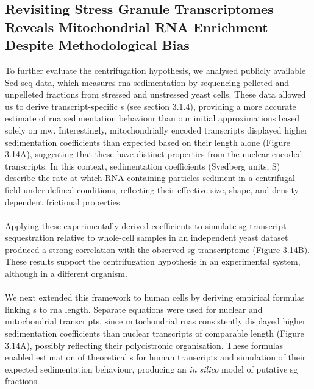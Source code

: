 \subsection{Revisiting Stress Granule Transcriptomes Reveals Mitochondrial RNA Enrichment Despite Methodological Bias}

To further evaluate the centrifugation hypothesis, we analysed publicly available Sed-seq data, which measures \gls{rna} sedimentation by sequencing pelleted and unpelleted fractions from stressed and unstressed yeast cells\cite{glauninger_transcriptome-wide_2025}. These data allowed us to derive transcript-specific \gls{s} (see section 3.1.4), providing a more accurate estimate of \gls{rna} sedimentation behaviour than our initial approximations based solely on \gls{mw}. Interestingly, mitochondrially encoded transcripts displayed higher sedimentation coefficients than expected based on their length alone (Figure 3.14A), suggesting that these have distinct properties from the nuclear encoded transcripts. In this context, sedimentation coefficients (Svedberg units, S) describe the rate at which RNA-containing particles sediment in a centrifugal field under defined conditions, reflecting their effective size, shape, and density-dependent frictional properties\cite{svedberg_ultracentrifuge_1940}.
\\
\\
Applying these experimentally derived coefficients to simulate \gls{sg} transcript sequestration relative to whole-cell samples in an independent yeast dataset\cite{khong_stress_2017} produced a strong correlation with the observed \gls{sg} transcriptome (Figure 3.14B). These results support the centrifugation hypothesis in an experimental system, although in a different organism.
\\
\\
We next extended this framework to human cells by deriving empirical formulas linking \gls{s} to \gls{rna} length. Separate equations were used for nuclear and mitochondrial transcripts, since mitochondrial \glspl{rna} consistently displayed higher sedimentation coefficients than nuclear transcripts of comparable length (Figure 3.14A), possibly reflecting their polycistronic organisation. These formulas enabled estimation of theoretical \gls{s} for human transcripts and simulation of their expected sedimentation behaviour, producing an \textit{in silico} model of putative \gls{sg} fractions.
\\
\\
